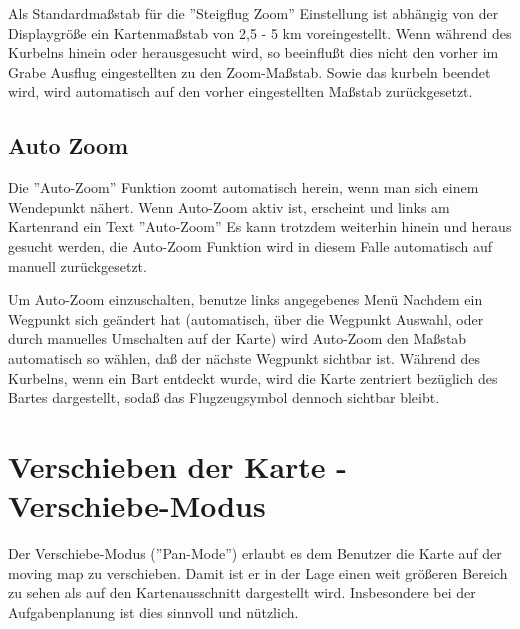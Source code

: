 Als Standardmaßstab für die ''Steigflug Zoom'' Einstellung ist abhängig  von der Displaygröße ein Kartenmaßstab von 2,5 - 5 km voreingestellt.
Wenn während des Kurbelns hinein oder herausgesucht wird, so beeinflußt dies nicht den vorher im Grabe Ausflug eingestellten zu den Zoom-Maßstab. Sowie das kurbeln beendet wird, wird automatisch auf den vorher eingestellten Maßstab zurückgesetzt.
\subsection*{Auto Zoom}
Die ''Auto-Zoom'' Funktion zoomt automatisch herein, wenn man sich einem Wendepunkt nähert.
Wenn Auto-Zoom aktiv ist, erscheint und links am Kartenrand ein Text ''Auto-Zoom''
Es kann trotzdem weiterhin hinein und heraus gesucht werden, die Auto-Zoom Funktion wird in diesem Falle automatisch auf manuell zurückgesetzt.

Um Auto-Zoom einzuschalten, benutze links angegebenes Menü
Nachdem ein Wegpunkt sich geändert hat (automatisch, über die Wegpunkt Auswahl, oder durch manuelles Umschalten auf der Karte) wird Auto-Zoom den Maßstab automatisch so wählen, daß der nächste Wegpunkt sichtbar ist. Während des Kurbelns, wenn ein Bart entdeckt wurde, wird die Karte zentriert bezüglich des Bartes dargestellt, sodaß das Flugzeugsymbol dennoch sichtbar bleibt.

\section{Verschieben der Karte - Verschiebe-Modus}

Der Verschiebe-Modus (''Pan-Mode'') erlaubt es dem Benutzer die Karte auf der moving map zu verschieben. Damit ist er in der Lage einen weit größeren Bereich zu sehen als auf den Kartenausschnitt dargestellt wird. Insbesondere bei der Aufgabenplanung ist dies sinnvoll und nützlich.



 
